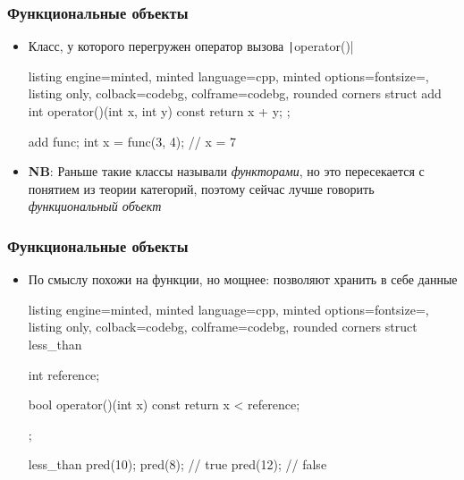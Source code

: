 \documentclass[10pt]{beamer}
\begin{document}
\begin{frame}[fragile]
\frametitle{Функциональные объекты}
\begin{itemize}
\item Класс, у которого перегружен оператор вызова \texttt|operator()|
\begin{tcblisting}{listing engine=minted, minted language=cpp, minted options={fontsize=\scriptsize}, listing only, colback=codebg, colframe=codebg, rounded corners}
struct add {
  int operator()(int x, int y) const {
    return x + y;
  }
};

add func;
int x = func(3, 4); // x = 7
\end{tcblisting}
\pause
\item \textbf{NB}: Раньше такие классы называли \textit{функторами}, но это пересекается с понятием из теории категорий, поэтому сейчас лучше говорить \textit{функциональный объект}
\end{itemize}
\end{frame}

\begin{frame}[fragile]
\frametitle{Функциональные объекты}
\begin{itemize}
\item По смыслу похожи на функции, но мощнее\pause: позволяют хранить в себе данные
\begin{tcblisting}{listing engine=minted, minted language=cpp, minted options={fontsize=\scriptsize}, listing only, colback=codebg, colframe=codebg, rounded corners}
struct less_than {
  int reference;

  bool operator()(int x) const {
    return x < reference;
  }
};

less_than pred(10);
pred(8); // true
pred(12); // false
\end{tcblisting}
\end{itemize}
\end{frame}
\end{document}
